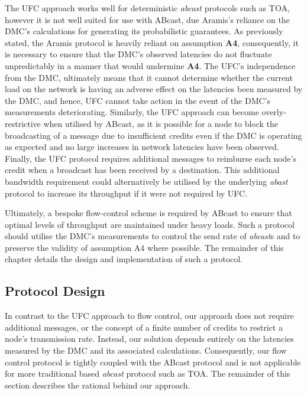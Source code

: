 The \textsf{UFC} approach works well for deterministic \emph{abcast} protocols such as TOA, however it is not well suited for use with \textsf{ABcast}, due \textsf{Aramis}'s reliance on the DMC's calculations for generating its probabilistic guarantees.  As previously stated, the \textsf{Aramis} protocol is heavily reliant on assumption \textbf{A4}, consequently, it is necessary to ensure that the DMC's observed latencies do not fluctuate unpredictably in a manner that would undermine \textbf{A4}.  The \textsf{UFC}'s independence from the DMC, ultimately means that it cannot determine whether the current load on the network is having an adverse effect on the latencies been measured by the DMC, and hence, \textsf{UFC} cannot take action in the event of the DMC's measurements deteriorating.  Similarly, the \textsf{UFC} approach can become overly-restrictive when utilised by \textsf{ABcast}, as it is possible for a node to block the broadcasting of a message due to insufficient credits even if the DMC is operating as expected and no large increases in network latencies have been observed.  Finally, the \textsf{UFC} protocol requires additional messages to reimburse each node's credit when a broadcast has been received by a destination.  This additional bandwidth requirement could alternatively be utilised by the underlying \emph{abast} protocol to increase its throughput if it were not required by \textsf{UFC}.  

Ultimately, a bespoke flow-control scheme is required by \textsf{ABcast} to ensure that optimal levels of throughput are maintained under heavy loads.  Such a protocol should utilise the DMC's measurements to control the send rate of \emph{abcast}s and to preserve the validity of assumption A4 where possible.  The remainder of this chapter details the design and implementation of such a protocol.  

    \subsection{Protocol Design}\label{sec:afc_protocol}
    In contrast to the \textsf{UFC} approach to flow control, our approach does not require additional messages, or the concept of a finite number of credits to restrict a node's transmission rate.  Instead, our solution depends entirely on the latencies measured by the DMC and its associated calculations.  Consequently, our flow control protocol is tightly coupled with the \textsf{ABcast} protocol and is not applicable for more traditional based \emph{abcast} protocol such as TOA.  The remainder of this section describes the rational behind our approach.  
    
